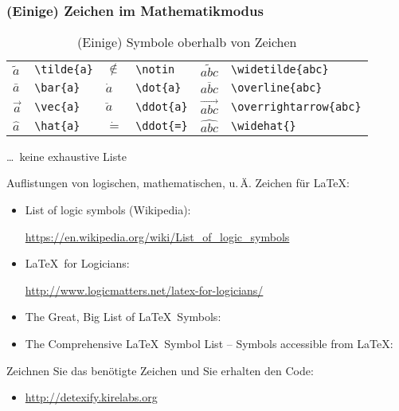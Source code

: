 \begin{frame}\frametitle{(Einige) Zeichen im Mathematikmodus}

\begin{table}
\caption{(Einige) Symbole oberhalb von Zeichen}
\centering
\begin{tabular}{ll|ll|ll}

$\tilde{a}$&	\texttt{\textbackslash tilde\{a\}}	&$\notin$	&	\texttt{\textbackslash notin}	&$\widetilde{abc}$	&	\texttt{\textbackslash widetilde\{abc\}}	\\
$\bar{a}$ &	\texttt{\textbackslash bar\{a\}}	&$\dot{a}$	&	\texttt{\textbackslash dot\{a\}}	&$\overline{abc}$	&	\texttt{\textbackslash overline\{abc\}}	\\
$\vec{a}$&	\texttt{\textbackslash vec\{a\}}	&$\ddot{a}$	&	\texttt{\textbackslash ddot\{a\}}	&$\overrightarrow{abc}$	&	\texttt{\textbackslash overrightarrow\{abc\}}	\\
$\hat{a}$&	\texttt{\textbackslash hat\{a\}}	&$\dot{=}$	&	\texttt{\textbackslash ddot\{=\}}	&$\widehat{abc}$	&	\texttt{\textbackslash widehat\{\}}
\end{tabular}
\end{table}

 \hfill \dots\ keine exhaustive Liste
 
\end{frame}


\begin{frame}

Auflistungen von logischen, mathematischen, u.\,Ä. Zeichen für \LaTeX :

\begin{itemize}
	\item List of logic symbols (Wikipedia): 
	
	\url{https://en.wikipedia.org/wiki/List_of_logic_symbols}
	
	\item \LaTeX\ for Logicians:
	
	\url{http://www.logicmatters.net/latex-for-logicians/}
	
	\item The Great, Big List of \LaTeX\ Symbols: \citet{Carlisle&Co01a}
	
	\item The Comprehensive \LaTeX\ Symbol List -- Symbols accessible from \LaTeX :  \citet{Pakin17a}
\end{itemize}

Zeichnen Sie das benötigte Zeichen und Sie erhalten den Code:

\begin{itemize}
	\item \url{http://detexify.kirelabs.org}
\end{itemize}
\end{frame}


